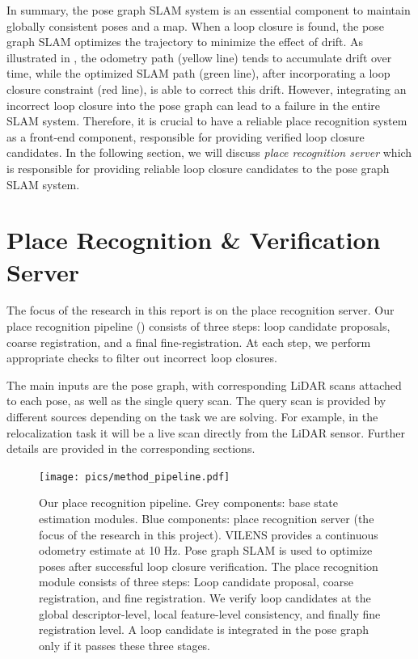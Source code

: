 In summary, the pose graph SLAM system is an essential component to maintain globally consistent poses and a map. When a loop closure is found, the pose graph SLAM optimizes the trajectory to minimize the effect of drift. As illustrated in , the odometry path (yellow line) tends to accumulate drift over time, while the optimized SLAM path (green line), after incorporating a loop closure constraint (red line), is able to correct this drift.
However, integrating an incorrect loop closure into the pose graph can lead to a failure in the entire SLAM system. Therefore, it is crucial to have a reliable place recognition system as a front-end component, responsible for providing verified loop closure candidates. In the following section, we will discuss \emph{ place recognition server} which is responsible for providing reliable loop closure candidates to the pose graph SLAM system.


\section{Place Recognition \& Verification Server} \label{sec:pipeline}
The focus of the research in this report is on the place recognition
server. Our place recognition pipeline () consists of three steps: loop candidate proposals, coarse registration, and a final fine-registration. At each step, we perform appropriate checks to filter out incorrect loop closures.

The main inputs are the pose graph, with corresponding LiDAR scans attached to each pose, as well as the single query scan. The query scan is provided by different sources depending on the task we are solving. For example, in the relocalization task it will be a live scan directly from the LiDAR sensor. Further details are provided in the corresponding sections.
\begin{figure}[t]
  \centering
  \texttt{[image: pics/method\_pipeline.pdf]}
  \caption{Our place recognition pipeline. Grey components: base state estimation modules. Blue components: place recognition server (the focus of the research in this project). VILENS provides a continuous odometry estimate at 10 Hz. Pose graph SLAM is used to optimize poses after successful loop closure verification. 
  The place recognition module consists of three steps: Loop candidate proposal, coarse registration, and fine registration. We verify loop candidates
  at the global descriptor-level, local feature-level consistency, and finally fine registration level. A loop candidate is integrated in the pose graph only if it passes these three stages.}
  \label{fig:pipeline}
\end{figure}

